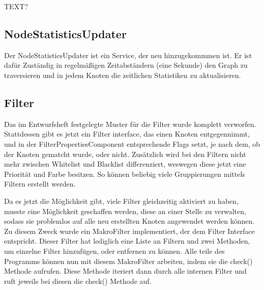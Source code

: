 TEXT?

\subsection{NodeStatisticsUpdater}

Der NodeStatisticsUpdater ist ein Service, der neu hinzugekommmen ist. Er ist dafür Zuständig in regelmäßigen Zeitabständern (eine Sekunde) den Graph zu traversieren und
in jedem Knoten die zeitlichen Statistiken zu aktualisieren.

\subsection{Filter}

Das im Entwurfsheft festgelegte Muster für die Filter wurde komplett verworfen. Stattdessen gibt es jetzt ein Filter interface, das einen Knoten entgegennimmt, und in der
FilterPropertiesComponent entsprechende Flags setzt, je nach dem, ob der Knoten gematcht wurde, oder nicht. Zusätzlich wird bei den Filtern nicht mehr zwischen Whitelist und
Blacklist differenziert, weswegen diese jetzt eine Priorität und Farbe besitzen. So können beliebig viele Gruppierungen mittels Filtern erstellt werden. \par
Da es jetzt die Möglichkeit gibt, viele Filter gleichzeitig aktiviert zu haben, musste eine Möglichkeit geschaffen werden, diese an einer Stelle zu verwalten, sodass sie problemlos
auf alle neu erstellten Knoten angewendet werden können. Zu diesem Zweck wurde ein MakroFilter implementiert, der dem Filter Interface entspricht. Dieser Filter hat lediglich eine
Liste an Filtern und zwei Methoden, um einzelne Filter hinzufügen, oder entfernen zu können. Alle teile des Programms können nun mit diesem MakroFilter arbeiten, indem sie die check()
Methode aufrufen. Diese Methode iteriert dann durch alle internen Filter und ruft jeweils bei diesen die check() Methode auf. 